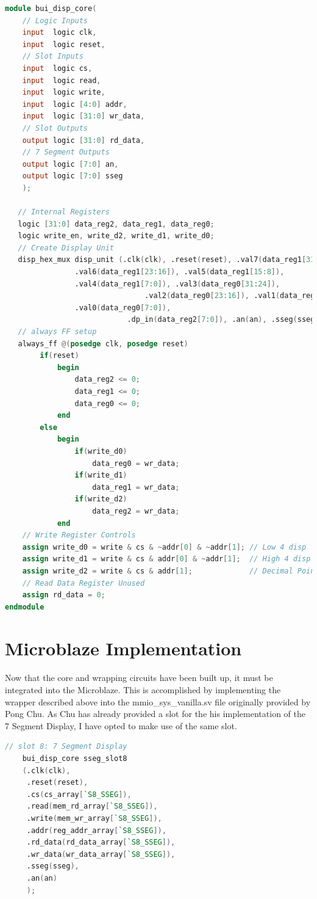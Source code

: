 \documentclass{article}
\begin{document}
\begin{lstlisting}[language = Verilog]
module bui_disp_core(
    // Logic Inputs
    input  logic clk,
    input  logic reset,
    // Slot Inputs
    input  logic cs,
    input  logic read,
    input  logic write,
    input  logic [4:0] addr,
    input  logic [31:0] wr_data,
    // Slot Outputs
    output logic [31:0] rd_data,
    // 7 Segment Outputs
    output logic [7:0] an,
    output logic [7:0] sseg
    );
   
   // Internal Registers
   logic [31:0] data_reg2, data_reg1, data_reg0;
   logic write_en, write_d2, write_d1, write_d0;
   // Create Display Unit
   disp_hex_mux disp_unit (.clk(clk), .reset(reset), .val7(data_reg1[31:24]), 
				.val6(data_reg1[23:16]), .val5(data_reg1[15:8]), 
				.val4(data_reg1[7:0]), .val3(data_reg0[31:24]),
                            	.val2(data_reg0[23:16]), .val1(data_reg0[15:8]),
				.val0(data_reg0[7:0]),
                            .dp_in(data_reg2[7:0]), .an(an), .sseg(sseg));
   // always FF setup
   always_ff @(posedge clk, posedge reset)
        if(reset)
            begin
                data_reg2 <= 0;
                data_reg1 <= 0;
                data_reg0 <= 0;
            end
        else
            begin
                if(write_d0)
                    data_reg0 = wr_data;
                if(write_d1)
                    data_reg1 = wr_data;
                if(write_d2)
                    data_reg2 = wr_data;
            end
    // Write Register Controls
    assign write_d0 = write & cs & ~addr[0] & ~addr[1]; // Low 4 disp
    assign write_d1 = write & cs & addr[0] & ~addr[1];  // High 4 disp
    assign write_d2 = write & cs & addr[1];             // Decimal Point     
    // Read Data Register Unused
    assign rd_data = 0;   
endmodule
\end{lstlisting}

\section{Microblaze Implementation}
Now that the core and wrapping circuits have been built up, it must be integrated into the Microblaze. This is accomplished by implementing the wrapper described above into the mmio\_sys\_vanilla.sv file originally provided by Pong Chu. As Chu has already provided a slot for the his implementation of the 7 Segment Display, I have opted to make use of the same slot.

\begin{lstlisting}[language=Verilog]
 // slot 8: 7 Segment Display
    bui_disp_core sseg_slot8
    (.clk(clk),
     .reset(reset),
     .cs(cs_array[`S8_SSEG]),
     .read(mem_rd_array[`S8_SSEG]),
     .write(mem_wr_array[`S8_SSEG]),
     .addr(reg_addr_array[`S8_SSEG]),
     .rd_data(rd_data_array[`S8_SSEG]),
     .wr_data(wr_data_array[`S8_SSEG]),
     .sseg(sseg),
     .an(an)
     );
     
\end{lstlisting}
\end{document}
